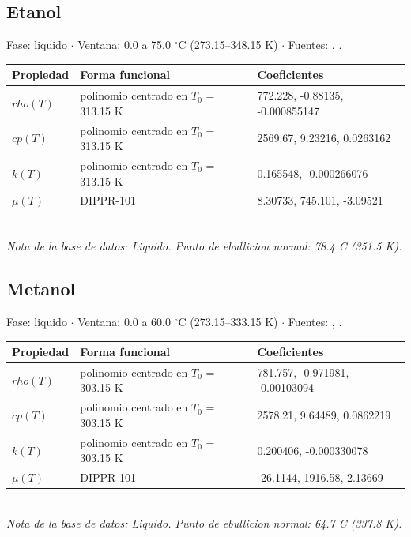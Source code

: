 \documentclass[11pt,a4paper]{article}
\begin{document}
\subsection*{Etanol}
{\small\color{gristexto} Fase: liquido $\cdot$ Ventana:
 0.0 a 75.0 $^\circ$C (273.15--348.15 K)
 $\cdot$ Fuentes: \cite{perry}, \cite{dippr}.}\\[2pt]
\begin{tabular}{llp{7.6cm}}
\toprule
\textbf{Propiedad} & \textbf{Forma funcional} & \textbf{Coeficientes} \\
\midrule
$rho(T)$ & polinomio centrado en $T_0$ = 313.15 K & 772.228, -0.88135, -0.000855147 \\
$cp(T)$ & polinomio centrado en $T_0$ = 313.15 K & 2569.67, 9.23216, 0.0263162 \\
$k(T)$ & polinomio centrado en $T_0$ = 313.15 K & 0.165548, -0.000266076 \\
$\mu(T)$ & DIPPR-101 & 8.30733, 745.101, -3.09521 \\
\bottomrule
\end{tabular}\\[3pt]
{\footnotesize\itshape Nota de la base de datos: Liquido. Punto de ebullicion normal: 78.4 C (351.5 K).}
\vspace{0.7em}


\subsection*{Metanol}
{\small\color{gristexto} Fase: liquido $\cdot$ Ventana:
 0.0 a 60.0 $^\circ$C (273.15--333.15 K)
 $\cdot$ Fuentes: \cite{perry}, \cite{dippr}.}\\[2pt]
\begin{tabular}{llp{7.6cm}}
\toprule
\textbf{Propiedad} & \textbf{Forma funcional} & \textbf{Coeficientes} \\
\midrule
$rho(T)$ & polinomio centrado en $T_0$ = 303.15 K & 781.757, -0.971981, -0.00103094 \\
$cp(T)$ & polinomio centrado en $T_0$ = 303.15 K & 2578.21, 9.64489, 0.0862219 \\
$k(T)$ & polinomio centrado en $T_0$ = 303.15 K & 0.200406, -0.000330078 \\
$\mu(T)$ & DIPPR-101 & -26.1144, 1916.58, 2.13669 \\
\bottomrule
\end{tabular}\\[3pt]
{\footnotesize\itshape Nota de la base de datos: Liquido. Punto de ebullicion normal: 64.7 C (337.8 K).}
\vspace{0.7em}
\end{document}
